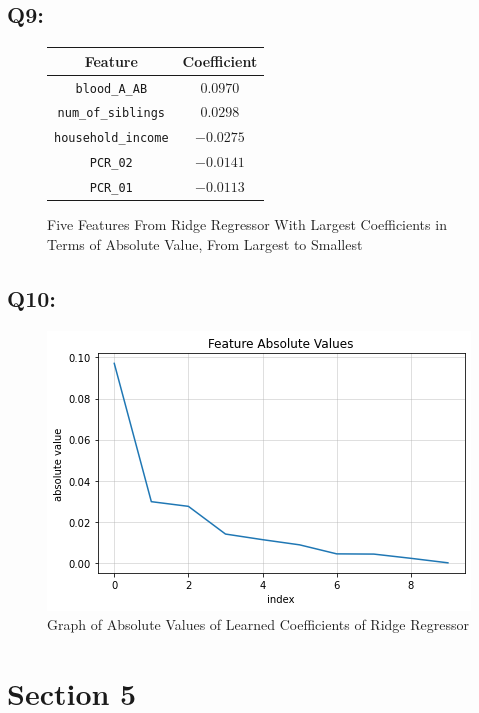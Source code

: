 \documentclass{article}
\newcommand{\code}[1]{\texttt{#1}}
\begin{document}
\subsection*{Q9:}
    \begin{figure}[H]
        \centering
        \begin{tabular}{|c|c|}
            \hline
            \rowcolor{gray!60}
            Feature & Coefficient \\ \hline
            \code{blood\_A\_AB} & $0.0970$ \\ \hline
            \code{num\_of\_siblings} & $0.0298$ \\ \hline
            \code{household\_income} & $-0.0275$ \\ \hline
            \code{PCR\_02} & $-0.0141$ \\ \hline
            \code{PCR\_01} & $-0.0113$ \\ \hline
        \end{tabular}
        \caption{Five Features From Ridge Regressor With Largest Coefficients in Terms of Absolute Value, From Largest to Smallest}
    \end{figure}
\subsection*{Q10:}
    \begin{figure}[H]
        \centering
        \includegraphics[scale=0.7]{q10.png}
        \caption{Graph of Absolute Values of Learned Coefficients of Ridge Regressor}
        \label{fig:q10}
    \end{figure}
\section*{Section 5}
\end{document}
